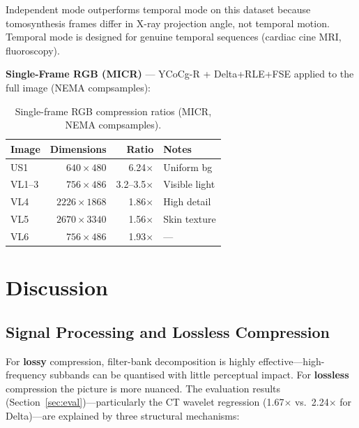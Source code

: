 \documentclass[journal]{IEEEtran}
\begin{document}
Independent mode outperforms temporal mode on this dataset because
tomosynthesis frames differ in X-ray projection angle, not temporal motion.
Temporal mode is designed for genuine temporal sequences (cardiac cine MRI,
fluoroscopy).

\textbf{Single-Frame RGB (MICR)} --- YCoCg-R + Delta+RLE+FSE applied to the
full image (NEMA compsamples):

\begin{table}[htbp]
\centering
\caption{Single-frame RGB compression ratios (MICR, NEMA compsamples).}
\label{tab:rgb}
\begin{tabular}{lrrp{2.0cm}}
\toprule
Image & Dimensions & Ratio & Notes \\
\midrule
US1    & $640{\times}480$   & 6.24$\times$ & Uniform bg \\
VL1--3 & $756{\times}486$   & 3.2--3.5$\times$ & Visible light \\
VL4    & $2226{\times}1868$ & 1.86$\times$ & High detail \\
VL5    & $2670{\times}3340$ & 1.56$\times$ & Skin texture \\
VL6    & $756{\times}486$   & 1.93$\times$ & --- \\
\bottomrule
\end{tabular}
\end{table}

\section{Discussion}
\label{sec:discussion}

\subsection{Signal Processing and Lossless Compression}

For \textbf{lossy} compression, filter-bank decomposition is highly
effective---high-frequency subbands can be quantised with little perceptual
impact. For \textbf{lossless} compression the picture is more nuanced. The
evaluation results (Section~\ref{sec:eval})---particularly the CT wavelet
regression (1.67$\times$ vs.\ 2.24$\times$ for Delta)---are explained by three
structural mechanisms:
\end{document}
